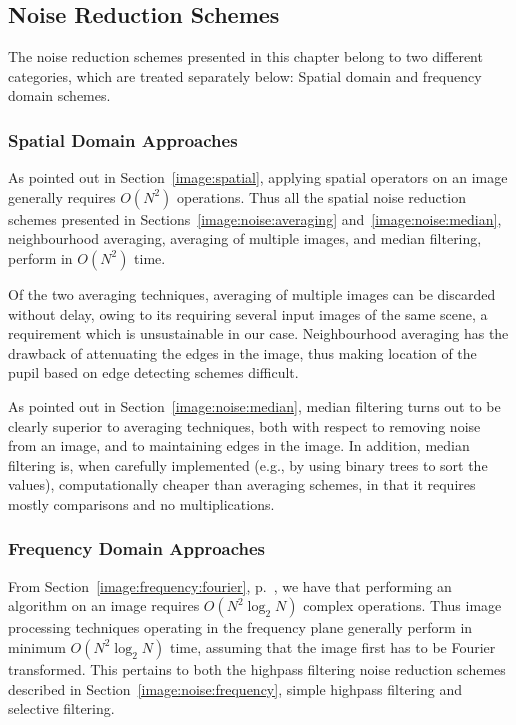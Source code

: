 \subsection{Noise Reduction Schemes}
\label{eval:eval:noise}

The noise reduction schemes presented in this chapter belong to two
different categories, which are treated separately below: Spatial
domain and frequency domain schemes.

\subsubsection{Spatial Domain Approaches}

As pointed out in Section~\ref{image:spatial}, applying spatial
operators on an image generally requires $O(N^{2})$ operations.  Thus
all the spatial noise reduction schemes presented in
Sections~\ref{image:noise:averaging} and~\ref{image:noise:median},
neighbourhood averaging, averaging of multiple images, and median
filtering, perform in $O(N^{2})$ time.

Of the two averaging techniques, averaging of multiple images can be
discarded without delay, owing to its requiring several input images
of the same scene, a requirement which is unsustainable in our case.
Neighbourhood averaging has the drawback of attenuating the edges in
the image, thus making location of the pupil based on edge detecting
schemes difficult.

As pointed out in Section~\ref{image:noise:median}, median filtering
turns out to be clearly superior to averaging techniques, both with
respect to removing noise from an image, and to maintaining edges in
the image.  In addition, median filtering is, when carefully
implemented (e.g., by using binary trees to sort the values),
computationally cheaper than averaging schemes, in that it requires
mostly comparisons and no multiplications.

\subsubsection{Frequency Domain Approaches}

From Section~\ref{image:frequency:fourier}, p.~\pageref{pg:fft:O}, we
have that performing an {\fft} algorithm on an image requires
$O(N^{2}\log_{2}N)$ complex operations.  Thus image processing
techniques operating in the frequency plane generally perform in
minimum $O(N^{2}\log_{2}N)$ time, assuming that the image first has to
be Fourier transformed.  This pertains to both the highpass filtering
noise reduction schemes described in
Section~\ref{image:noise:frequency}, simple highpass filtering and
selective filtering.

